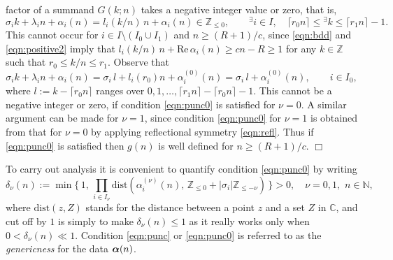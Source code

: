 \documentclass[a4paper,12pt]{article}
\theoremstyle{plain}
\def\rRe{\mathrm{Re}}
\def\C{\mathbb{C}}
\def\N{\mathbb{N}}
\def\Z{\mathbb{Z}}
\def\bal{\mbox{\boldmath $\alpha$}}
\begin{document}
factor of a summand $G(k; n)$ takes a negative integer value or zero, that is,  
\[
\sigma_i k + \lambda_i n + \alpha_i(n)  = l_i(k/n) \, n + \alpha_i(n)  \in \Z_{\le 0}, 
\qquad {}^{\exists} i \in I, \quad 
\lceil r_0 n \rceil \le {}^{\exists} k \le \lceil r_1 n \rceil -1.  
\]
This cannot occur for $i \in I \setminus (I_0 \cup I_1)$ and $n \ge (R+1)/c$,  
since \eqref{eqn:bdd} and \eqref{eqn:positive2} imply that 
$l_i(k/n) \, n + \rRe \, \alpha_i(n) \ge c n -R \ge 1$ for any  
$k \in \Z$ such that $r_0 \le k/n \le r_1$. 
Observe that 
\[
\sigma_i k + \lambda_i n + \alpha_i(n) = \sigma_i \, l + l_i(r_0) n + 
\alpha^{(0)}_i(n) = \sigma_i \, l + \alpha^{(0)}_i(n), \qquad i \in I_0,  
\]
where $l := k - \lceil r_0 n \rceil$ ranges over 
$0, 1, \dots, \lceil r_1 n \rceil - \lceil r_0 n \rceil -1$. 
This cannot be a negative integer or zero, if condition \eqref{eqn:punc0} is 
satisfied for $\nu = 0$.      
A similar argument can be made for $\nu = 1$, since condition \eqref{eqn:punc0} 
for $\nu =1$ is obtained from that for $\nu=0$ by applying reflectional 
symmetry \eqref{eqn:refl}.   
Thus if \eqref{eqn:punc0} is satisfied then $g(n)$ is well defined for 
$n \ge (R+1)/c$. 
\hfill $\Box$ \par\medskip
To carry out analysis it is convenient to quantify condition \eqref{eqn:punc0} 
by writing   
\begin{equation} \label{eqn:punc}
\delta_{\nu}(n) := \min \Big\{ \, 1, \, 
\prod_{i \in I_{\nu} } \mathrm{dist} (\alpha_i^{(\nu)} (n), \, 
\Z_{\le 0} + |\sigma_i| \Z_{\le - \nu}) \, \Big\} > 0, \quad \nu = 0, 1, \,\, 
n \in \N, 
\end{equation}
where $\mathrm{dist}(z, Z)$ stands for the distance between a point $z$ and 
a set $Z$ in $\C$, and cut off by $1$ is simply to make 
$\delta_{\nu}(n) \le 1$ as it really works only when $0 < \delta_{\nu}(n) \ll 1$.   
Condition \eqref{eqn:punc} or \eqref{eqn:punc0} is referred to as the 
{\sl genericness} for the data $\bal(n)$. 
\end{document}
